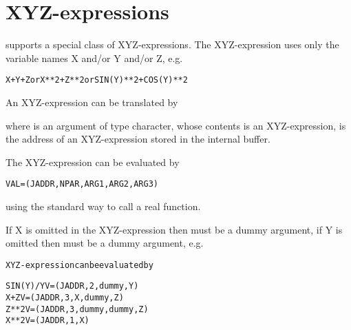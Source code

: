 \newpage %

\section{XYZ-expressions}
 
\COMIS{} supports a special class of XYZ-expressions. The XYZ-expression
uses only the variable names X and/or Y and/or Z, e.g.

\begin{alltt}
      X+Y+Z  or X**2+Z**2  or SIN(Y)**2+COS(Y)**2
\end{alltt}
 
An XYZ-expression can be translated by


where  is an argument of type character, whose contents is an XYZ-expression,
 is the address of an XYZ-expression stored in the  \COMIS{} internal buffer.
 
The XYZ-expression can be evaluated by

\begin{alltt}
      VAL = (JADDR,NPAR,ARG1,ARG2,ARG3)
\end{alltt}

using the standard way to call a \COMIS{} real function.
 
If X is omitted in the XYZ-expression then  must be a dummy argument,
if Y is omitted then  must be a dummy argument, e.g.

\begin{alltt}
  \textrm{XYZ-expression}        \textrm{can be evaluated by}

  SIN(Y)/Y              V = (JADDR,2,dummy,Y)
  X+Z                   V = (JADDR,3,X,dummy,Z)
  Z**2                  V = (JADDR,3,dummy,dummy,Z)
  X**2                  V = (JADDR,1,X)
\end{alltt}


